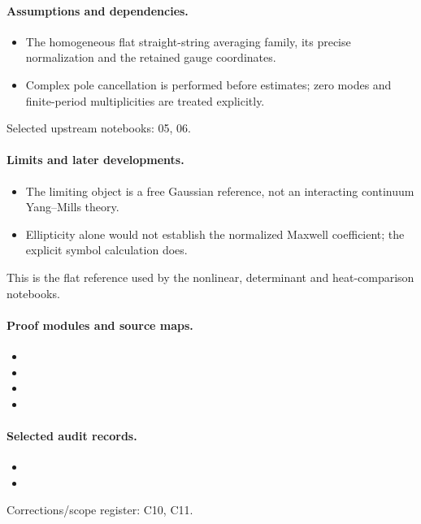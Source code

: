 \paragraph{Assumptions and dependencies.}
\begin{itemize}
\item The homogeneous flat straight-string averaging family, its precise normalization and the retained gauge coordinates.
\item Complex pole cancellation is performed before estimates; zero modes and finite-period multiplicities are treated explicitly.
\end{itemize}

Selected upstream notebooks: 05, 06.\par

\paragraph{Limits and later developments.}
\begin{itemize}
\item The limiting object is a free Gaussian reference, not an interacting continuum Yang--Mills theory.
\item Ellipticity alone would not establish the normalized Maxwell coefficient; the explicit symbol calculation does.
\end{itemize}

This is the flat reference used by the nonlinear, determinant and heat-comparison notebooks.

\paragraph{Proof modules and source maps.}
\begingroup\small
\begin{itemize}
\item {}
\item {}
\item {}
\item {}
\end{itemize}
\endgroup

\paragraph{Selected audit records.}
\begingroup\small
\begin{itemize}
\item {}
\item {}
\end{itemize}
\endgroup
Corrections/scope register: C10, C11.\par

